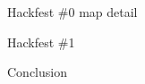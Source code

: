 \documentclass{beamer}
\begin{document}
\begin{frame}{Hackfest \#0 map detail}

\end{frame}

\begin{frame}{Hackfest \#1}
  \begin{center}
  \end{center}
\end{frame}

\begin{frame}[t]{Conclusion}
\end{frame}
\end{document}
